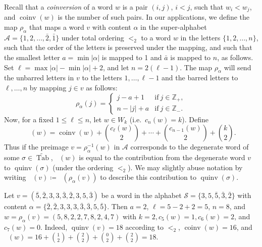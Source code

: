 \documentclass[ALCO,Unicode]{cedram}
\DeclareMathOperator{\PQT}{Tab}
\DeclareMathOperator{\coinv}{coinv}
\DeclareMathOperator{\quinvL}{\quinv^{(\ell)}}
\DeclareMathOperator{\quinv}{quinv}
\begin{document}
Recall that a {\em coinversion} of a word $w$ is a pair $(i,j)$, $i < j$, such that $w_i < w_j$, and $\coinv(w)$ is the number of such pairs. In our applications, we define the map $\rho_{\alpha}$ that maps a word $v$ with content $\alpha$ in the super-alphabet $\mathcal{A}=\{1,2,\ldots,\bar{2},\bar{1}\}$ under total ordering $<_2$ to a word $w$ in the letters $\{1,2,\ldots,n\}$, such that the order of the letters is preserved under the mapping, and such that the smallest letter $a=\min |\alpha|$ is mapped to 1 and $\bar{a}$ is mapped to $n$, as follows. Set $\ell=\max |\alpha|-\min |\alpha|+2$, and let $n=2(\ell-1)$. The map $\rho_{\alpha}$ will send the unbarred letters in $v$ to the letters $1,\ldots,\ell-1$ and the barred letters to $\ell, \dots, n$ by mapping $j \in v$ as follows: 
\[
\rho_{\alpha}(j)= \begin{cases}
j-a + 1 & \mbox{if}\ j\in\mathbb{Z}_+,\\
n-|j|+a & \mbox{if}\ j\in\mathbb{Z}_-.
\end{cases}
\] 
Now, for a fixed $1 \leq \ell \leq n$, let $w\in W_k$ (i.e.~$c_n(w)=k$). Define
\begin{equation}
\label{word-quinv-def}
\quinvL(w) = \coinv(w) + \binom{c_\ell(w)}{2} + \cdots + \binom{c_{n-1}(w)}{2} +\binom{k}{2}.
\end{equation}
Thus if the preimage $v=\rho_{\alpha}^{-1}(w)$ in $\mathcal{A}$ corresponds to the degenerate word of some $\sigma \in \widetilde{\PQT}$, $\quinvL(w)$ is equal to the contribution from the degenerate word $v$ to $\quinv(\sigma)$ (under the ordering $<_2$). We may slightly abuse notation by writing $\quinvL(v)\coloneqq 
\quinvL(\rho_{\alpha}(v))$ to describe this contribution to $\quinv(\sigma)$.

\begin{example}
Let $v=(\bar{5},\bar{2},3,3,\bar{3},\bar{2},3,5,\bar{3})$ be a word in the alphabet $\mathcal{S}=\{3,5,\bar5,\bar3,\bar2\}$ with content $\alpha=\{\bar{2},\bar{2},3,3,3,\bar{3},\bar{3},5,\bar{5}\}$. Then $a=2$, $\ell=5-2+2=5$, $n=8$, and $w=\rho_{\alpha}(v)=(5,8,2,2,7,8,2,4,7)$ with $k=2, c_5(w)=1, c_6(w)=2$, and $c_7(w)=0$. Indeed, $\quinv(v)=18$ according to $<_2$, $\coinv(w)=16$, and $\quinvL(w)=16+{1 \choose 2}+{2 \choose 2}+{0 \choose 2}+{2 \choose 2}=18$. 
\end{example}
\end{document}
